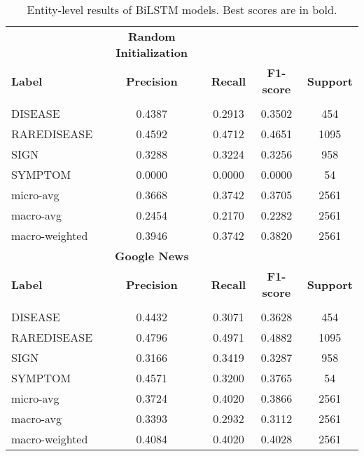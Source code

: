 \documentclass[preprint,12pt]{elsarticle}
\begin{document}
\begin{table}[!htbp]
\centering
\small
\caption{\label{tab:BiLSTM}Entity-level results of  BiLSTM models. Best scores are in bold.}
\begin{tabular}{lcccc}
\\
& \multicolumn{1}{c}{\textbf{Random Initialization}} \\
{\bf Label} & {\bf Precision} &
{\bf Recall} &
{\bf F1-score} & {\bf Support} 
\\
\hline\\[-8pt]

DISEASE	&	0.4387	&	0.2913	&	0.3502	&	454\\
RAREDISEASE	&	0.4592	&	0.4712	&	0.4651	&	1095\\SIGN	&	0.3288	&	0.3224	&	0.3256	&	958\\SYMPTOM	&	0.0000	&	0.0000	&	0.0000	&	54\\

micro-avg	&	0.3668	&	0.3742	&	0.3705	&	2561\\macro-avg	&	0.2454	&	0.2170	&	0.2282	&	2561\\
macro-weighted	&	0.3946	&	0.3742	&	0.3820	&	2561\\
\hline

& \multicolumn{1}{c}{\textbf{Google News}} \\
{\bf Label} & {\bf Precision} &
{\bf Recall} &
{\bf F1-score} & {\bf Support} \\
\hline\\[-8pt]

DISEASE	&	0.4432	&	0.3071	&	0.3628	&	454\\RAREDISEASE	&	0.4796	&	0.4971	&	0.4882	&	1095\\SIGN	&	0.3166	&	0.3419	&	0.3287	&	958\\SYMPTOM	&	0.4571	&	0.3200	&	0.3765	&	54\\
micro-avg	&	0.3724	&	0.4020	&	0.3866	&	2561\\macro-avg	&	0.3393	&	0.2932	&	0.3112	&	2561\\
macro-weighted	&	0.4084	&	0.4020	&	0.4028	&	2561\\



\end{tabular}
\end{table}
\end{document}
